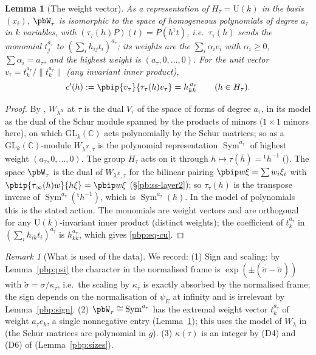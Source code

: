 \documentclass[10pt]{amsart}
\newtheorem{lemma}[theorem]{Lemma}
\theoremstyle{definition}
\theoremstyle{remark}
\newtheorem{remark}[theorem]{Remark}
\newcommand{\C}{\mathbb C}
\providecommand{\auU}{\mathrm U}
\providecommand{\aubar}[1]{\overline{#1}}
\begin{document}
\begin{lemma}[The weight vector]\label{pbp:W}
As a representation of $H_\tau=\auU(k)$ in the basis $(x_i)$, $\pbW_\tau$ is isomorphic to the space
of homogeneous polynomials of degree $a_\tau$ in $k$ variables, with $(\tau_\tau(h)P)(t)=P(h^{\mathrm t}
t)$, i.e.\ $\tau_\tau(h)$ sends the monomial $t_j^{a_\tau}$ to $(\sum_ih_{ij}t_i)^{a_\tau}$; its
weights are the $\sum_i\alpha_ie_i$ with $\alpha_i\ge0$, $\sum\alpha_i=a_\tau$, and the highest weight
is $(a_\tau,0,\dots,0)$. For the unit vector $v_\tau=t_k^{a_\tau}/\|t_k^{a_\tau}\|$ \textup(any
invariant inner product\textup),
\begin{equation}\label{pbp:eq-cu}
c'(h):=\pbip{v_\tau}{\tau_\tau(h)v_\tau}=h_{kk}^{\,a_\tau}\qquad(h\in H_\tau).
\end{equation}
\end{lemma}
\begin{proof}
By {\cite[\S14.3]{P46}}, $W_{\lambda^X}$ at $\tau$ is the dual $V_\tau$ of the space of forms of degree
$a_\tau$, in its model as the dual of the Schur module spanned by the products of minors ($1\times1$
minors here), on which $\mathrm{GL}_k(\C)$ acts polynomially by the Schur matrices; so as a
$\mathrm{GL}_k(\C)$-module $W_{\lambda^X,\tau}$ is the polynomial representation $\operatorname{Sym}^{a_\tau}$
of highest weight $(a_\tau,0,\dots,0)$. The group $H_\tau$ acts on it through $h\mapsto\tau(\bar h)=
{}^{\mathrm t}h^{-1}$ ({\cite[\S14.3]{P46}}). The space $\pbW_\tau$ is the dual of $W_{\lambda^X,\tau}$ for the
bilinear pairing $\pbip w\xi=\sum w_i\xi_i$ with $\pbip{\tau_\infty(h)w}{h\xi}=\pbip w\xi$
(\S\ref{pb:ss-layer2}); so $\tau_\tau(h)$ is the transpose inverse of $\operatorname{Sym}^{a_\tau}
({}^{\mathrm t}h^{-1})$, which is $\operatorname{Sym}^{a_\tau}(h)$. In the model of polynomials this is the
stated action. The monomials are weight vectors and are orthogonal for any $\auU(k)$-invariant inner
product (distinct weights); the coefficient of $t_k^{a_\tau}$ in $(\sum_ih_{ik}t_i)^{a_\tau}$ is
$h_{kk}^{a_\tau}$, which gives \eqref{pbp:eq-cu}.
\end{proof}

\begin{remark}[What is used of the data]\label{pbp:rem-doubts}
We record: (1) Sign and scaling: by
Lemma~\ref{pbp:psi} the character in the normalised frame is $\exp(\pm(\aubar{\tilde\sigma}-
\tilde\sigma))$ with $\tilde\sigma=\sigma/\kappa_\tau$, i.e.\ the scaling by $\kappa_\tau$ is exactly
absorbed by the normalised frame; the sign depends on the normalisation of $\psi_E$ at infinity and is
irrelevant by Lemma~\ref{pbp:sign}. (2) $\pbW_\tau\cong\operatorname{Sym}^{a_\tau}$ has the extremal weight
vector $t_k^{a_\tau}$ of weight $a_\tau e_k$, a single nonnegative entry (Lemma~\ref{pbp:W}); this
uses the model of $W_\lambda$ in {\cite[\S14.3]{P46}} (the Schur matrices are polynomial in $g$). (3) $\kappa(\tau)$ is an integer by (D4) and (D6) of
{\cite[Definition~13.3]{P46}} (Lemma~\ref{pbp:sizes}).
\end{remark}
\end{document}
